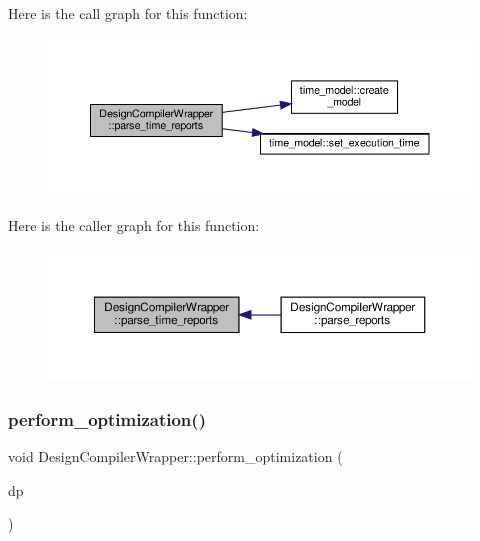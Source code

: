 Here is the call graph for this function\+:
\nopagebreak
\begin{figure}[H]
\begin{center}
\leavevmode
\includegraphics[width=350pt]{d5/d55/classDesignCompilerWrapper_a909166c0af1cb85b7ac5557add21f67c_cgraph}
\end{center}
\end{figure}
Here is the caller graph for this function\+:
\nopagebreak
\begin{figure}[H]
\begin{center}
\leavevmode
\includegraphics[width=350pt]{d5/d55/classDesignCompilerWrapper_a909166c0af1cb85b7ac5557add21f67c_icgraph}
\end{center}
\end{figure}
\mbox{\label{classDesignCompilerWrapper_ab90629feb4fe9a74bb57606610561724}} 
\subsubsection{\texorpdfstring{perform\+\_\+optimization()}{perform\_optimization()}}
{\footnotesize\ttfamily void Design\+Compiler\+Wrapper\+::perform\+\_\+optimization (\begin{DoxyParamCaption}\item[{const \hyperlink{DesignParameters_8hpp_ae36bb1c4c9150d0eeecfe1f96f42d157}{Design\+Parameters\+Ref}}]{dp }\end{DoxyParamCaption})\hspace{0.3cm}{\ttfamily [protected]}}



